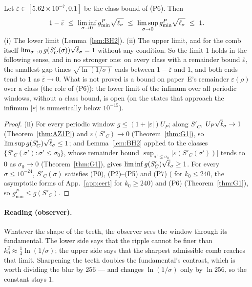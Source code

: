 \begin{corollary} \label{cor:limit}
Let $\bar\varepsilon\in[5.62\times10^{-7},0.1]$ be the class bound of (P6). Then
\begin{equation*}
1-\bar\varepsilon\ \le\ \liminf_{\sigma\to0}g_{\min}^P\sqrt{\ls}\ \le\ \limsup_{\sigma\to0}g_{\min}^P\sqrt{\ls}\ \le\ 1 .
\end{equation*}
(i) \proofst{} The lower limit (Lemma~\ref{lem:BH2}). (ii)  The upper limit, and for the comb itself
$\lim_{\sigma\to0}g(S'_C(\sigma))\sqrt\ls=1$ without any condition. So the limit $1$ holds in the following sense, and in no stronger one: on every class with a
remainder bound $\bar\varepsilon$, the smallest gap times $\sqrt{\ln(1/\sigma)}$ ends between $1-\bar\varepsilon$ and $1$, and both ends tend to $1$ as
$\bar\varepsilon\to0$. What is not proved is a bound on paper~E's remainder $\varepsilon(\rho)$ over a class (the role of (P6)): the lower limit of the
infimum over all periodic windows, without a class bound, is open (on the states that approach the infimum $|\varepsilon|$ is numerically below $10^{-15}$).
\end{corollary}
\begin{proof}
(ii) For every periodic window $g\le(1+|\varepsilon|)U_P$; along $S'_C$, $U_P\sqrt\ls\to1$ (Theorem~\ref{thm:AZ1P}) and $\varepsilon(S'_C)\to0$ (Theorem~\ref{thm:G1}), so
$\limsup g(S'_C)\sqrt\ls\le1$; and Lemma~\ref{lem:BH2} applied to the classes $\{S'_C(\sigma'):\sigma'\le\sigma_0\}$, whose remainder bound $\sup_{\sigma'\le\sigma_0}|\varepsilon(S'_C(\sigma'))|$
tends to $0$ as $\sigma_0\to0$ (Theorem~\ref{thm:G1}), gives $\liminf g(S'_C)\sqrt\ls\ge1$. For every $\sigma\le10^{-24}$, $S'_C(\sigma)$ satisfies (P0), (P2)--(P5) and (P7) ( for $k_0\le240$, the asymptotic forms of
App.~\ref{app:cert} for $k_0\ge240$) and (P6) (Theorem~\ref{thm:G1}), so $g_{\min}^P\le g(S'_C)$.
\end{proof}

\paragraph*{Reading (observer).}
Whatever the shape of the teeth, the observer sees the window through its fundamental. The lower side says that the ripple cannot be finer
than $k_0^2\approx\tfrac14\ln(1/\sigma)$; the upper side says that the sharpest admissible comb reaches that limit. Sharpening the teeth
doubles the fundamental's contrast, which is worth dividing the blur by $256$ --- and changes $\ln(1/\sigma)$ only by $\ln256$, so the
constant stays $1$.
